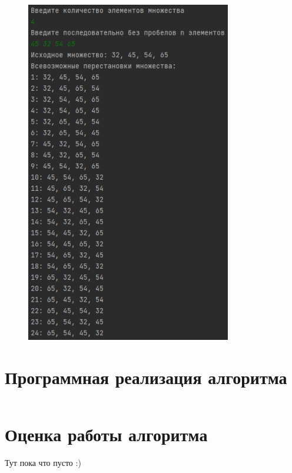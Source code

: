 \documentclass[bachelor, och, labwork]{shiza}
\begin{document}
        \begin{figure}[H]
            \centering
            \includegraphics[width=0.8\textwidth]{1.png}
            \caption{}
        \end{figure}

\section{Программная реализация алгоритма}

\inputminted[linenos,breaklines=true, fontsize=\small, style=bw]{python}{1.py}


\section{Оценка работы алгоритма}

Тут пока что пусто :)
\end{document}
